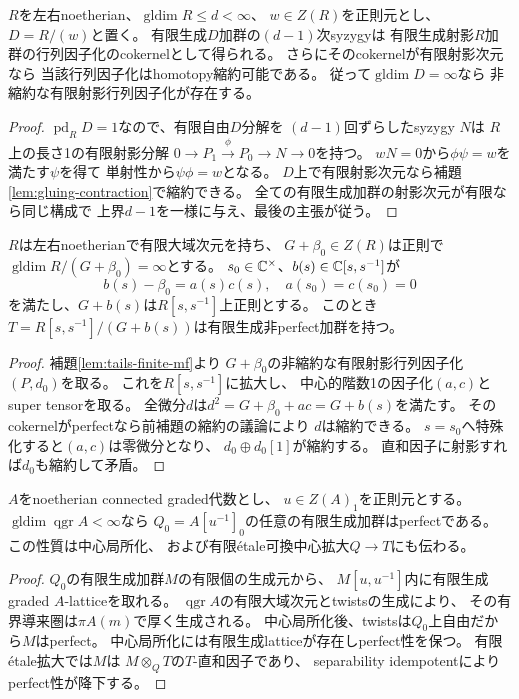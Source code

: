 \begin{lemma}[有限射影行列因子化によるnonperfectness検出]
\label{lem:tails-finite-mf}
$R$を左右noetherian、$\operatorname{gldim}R\le d<\infty$、
$w\in Z(R)$を正則元とし、$D=R/(w)$と置く。
有限生成$D$加群の$(d-1)$次syzygyは
有限生成射影$R$加群の行列因子化のcokernelとして得られる。
さらにそのcokernelが有限射影次元なら
当該行列因子化はhomotopy縮約可能である。
従って$\operatorname{gldim}D=\infty$なら
非縮約な有限射影行列因子化が存在する。
\end{lemma}
\begin{proof}
$\operatorname{pd}_R D=1$なので、有限自由$D$分解を
$(d-1)$回ずらしたsyzygy $N$は
$R$上の長さ1の有限射影分解
$0\to P_1\xrightarrow{\phi}P_0\to N\to0$を持つ。
$wN=0$から$\phi\psi=w$を満たす$\psi$を得て
単射性から$\psi\phi=w$となる。
$D$上で有限射影次元なら補題\ref{lem:gluing-contraction}で縮約できる。
全ての有限生成加群の射影次元が有限なら同じ構成で
上界$d-1$を一様に与え、最後の主張が従う。
\end{proof}

\begin{lemma}[中心値の二重分岐はnonperfectnessを保存]
\label{lem:tails-double-zero}
$R$は左右noetherianで有限大域次元を持ち、
$G+\beta_0\in Z(R)$は正則で
$\operatorname{gldim}R/(G+\beta_0)=\infty$とする。
$s_0\in\mathbb C^\times$、$b(s)\in\mathbb C[s,s^{-1}]$が
\[
 b(s)-\beta_0=a(s)c(s),\quad
 a(s_0)=c(s_0)=0
\]
を満たし、$G+b(s)$は$R[s,s^{-1}]$上正則とする。
このとき
$T=R[s,s^{-1}]/(G+b(s))$は有限生成非perfect加群を持つ。
\end{lemma}
\begin{proof}
補題\ref{lem:tails-finite-mf}より
$G+\beta_0$の非縮約な有限射影行列因子化
$(P,d_0)$を取る。
これを$R[s,s^{-1}]$に拡大し、
中心的階数1の因子化$(a,c)$とsuper tensorを取る。
全微分$d$は$d^2=G+\beta_0+ac=G+b(s)$を満たす。
そのcokernelがperfectなら前補題の縮約の議論により
$d$は縮約できる。
$s=s_0$へ特殊化すると$(a,c)$は零微分となり、
$d_0\oplus d_0[1]$が縮約する。
直和因子に射影すれば$d_0$も縮約して矛盾。
\end{proof}

\begin{lemma}
\label{lem:tails-chart-perfect}
$A$をnoetherian connected graded代数とし、
$u\in Z(A)_1$を正則元とする。
$\operatorname{gldim}\operatorname{qgr}A<\infty$なら
$Q_0=A[u^{-1}]_0$の任意の有限生成加群はperfectである。
この性質は中心局所化、
および有限\'etale可換中心拡大$Q\to T$にも伝わる。
\end{lemma}
\begin{proof}
$Q_0$の有限生成加群$M$の有限個の生成元から、
$M[u,u^{-1}]$内に有限生成graded $A$-latticeを取れる。
$\operatorname{qgr}A$の有限大域次元とtwistsの生成により、
その有界導来圏は$\pi A(m)$で厚く生成される。
中心局所化後、twistsは$Q_0$上自由だから$M$はperfect。
中心局所化には有限生成latticeが存在しperfect性を保つ。
有限\'etale拡大では$M$は
$M\otimes_QT$の$T$-直和因子であり、
separability idempotentによりperfect性が降下する。
\end{proof}

